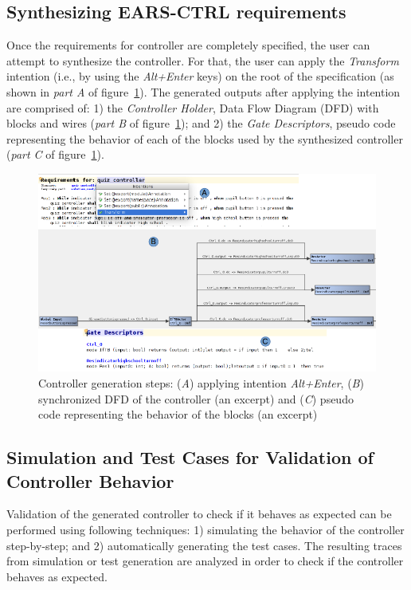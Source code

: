 \subsection{Synthesizing \textsf{EARS-CTRL} requirements}
\vspace{-.2cm}
Once the requirements for controller are completely specified, the user can
attempt to synthesize the controller. For that, the user can apply the
\emph{Transform} intention (i.e., by using the \emph{Alt+Enter} keys) on the root of the specification (as
shown in \emph{part A} of figure~\ref{fig:Spec_transform}). The generated outputs after applying the
intention are comprised of: 1) the \emph{Controller Holder}, Data Flow
Diagram (DFD) with blocks and wires (\emph{part B} of
figure~\ref{fig:Spec_transform}); and 2) the \emph{Gate Descriptors}, pseudo
code representing the behavior of each of the blocks used by the synthesized controller (\emph{part C} of
figure~\ref{fig:Spec_transform}).
\begin{figure}[!h]
\centering
\includegraphics[width=1\textwidth]{./images/Transform.png}
\caption{Controller generation steps: (\emph{A}) applying intention \emph{Alt+Enter},
(\emph{B}) synchronized DFD of the controller (an excerpt)
and (\emph{C}) pseudo code representing the behavior of the blocks (an excerpt)}
\label{fig:Spec_transform}
\end{figure}
\vspace{-.5cm}
\subsection{Simulation and Test Cases for Validation of Controller Behavior}
\vspace{-.2cm}
Validation of the generated controller to check if it behaves as expected can be
performed using following techniques: 1) simulating the behavior of the
controller step-by-step; and 2) automatically generating the test cases.
The resulting traces from simulation or test generation are analyzed in order to
check if the controller behaves as expected.

